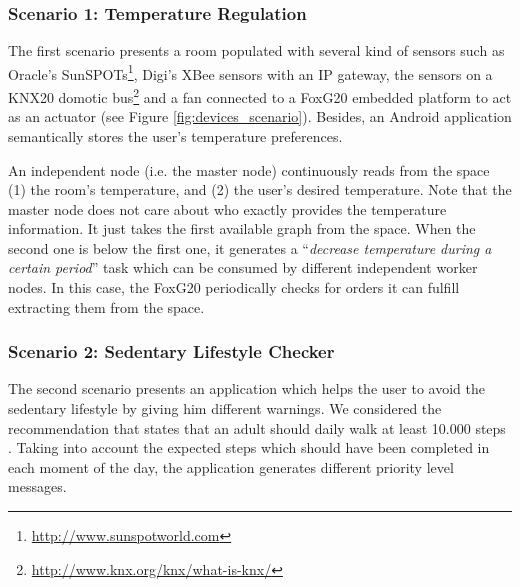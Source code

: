 

\subsubsection{Scenario 1: Temperature Regulation}

The first scenario presents a room populated with several kind of sensors such as Oracle's SunSPOTs\footnote{\url{http://www.sunspotworld.com}},
Digi's XBee sensors with an IP gateway,
the sensors on a KNX20 domotic bus\footnote{\url{http://www.knx.org/knx/what-is-knx/}} and a fan connected to a FoxG20 embedded platform to act as an actuator (see Figure \ref{fig:devices_scenario}).
Besides, an Android application semantically stores the user's temperature preferences.




An independent node (i.e. the master node) continuously reads from the space %
(1) the room's temperature, and
(2) the user's desired temperature.
Note that the master node does not care about who exactly provides the temperature information.
It just takes the first available graph from the space.
When the second one is below the first one, it generates a ``\emph{decrease temperature during a certain period}'' task which can be consumed by different independent worker nodes.
In this case, the FoxG20 periodically checks for orders it can fulfill extracting them from the space. %


\subsubsection{Scenario 2: Sedentary Lifestyle Checker}

The second scenario presents an application which helps the user to avoid the sedentary lifestyle by giving him different warnings.
We considered the recommendation that states that an adult should daily walk at least 10.000 steps \citep{tudor2002taking}.
Taking into account the expected steps which should have been completed in each moment of the day, the application generates different priority level messages.

